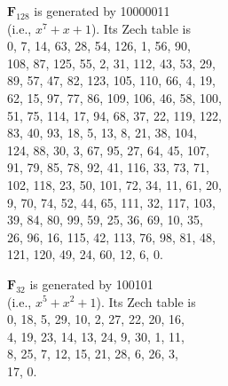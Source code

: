 \documentclass[a4paper]{article}
\def\FF{\mathbf F}
\begin{document}
$\FF_{128}$ is generated by 10000011 \\
(i.e., $x^7 + x + 1$).
Its Zech table is \\
0, 7, 14, 63, 28, 54, 126, 1, 56, 90, \\
108, 87, 125, 55, 2, 31, 112, 43, 53, 29, \\
89, 57, 47, 82, 123, 105, 110, 66, 4, 19, \\
62, 15, 97, 77, 86, 109, 106, 46, 58, 100, \\
51, 75, 114, 17, 94, 68, 37, 22, 119, 122, \\
83, 40, 93, 18, 5, 13, 8, 21, 38, 104, \\
124, 88, 30, 3, 67, 95, 27, 64, 45, 107, \\
91, 79, 85, 78, 92, 41, 116, 33, 73, 71, \\
102, 118, 23, 50, 101, 72, 34, 11, 61, 20, \\
9, 70, 74, 52, 44, 65, 111, 32, 117, 103, \\
39, 84, 80, 99, 59, 25, 36, 69, 10, 35, \\
26, 96, 16, 115, 42, 113, 76, 98, 81, 48, \\
121, 120, 49, 24, 60, 12, 6, 0.

\vskip-15cm

$\FF_{32}$ is generated by 100101 \\
(i.e., $x^5 + x^2 + 1$).
Its Zech table is \\
0, 18, 5, 29, 10, 2, 27, 22, 20, 16, \\
4, 19, 23, 14, 13, 24, 9, 30, 1, 11, \\
8, 25, 7, 12, 15, 21, 28, 6, 26, 3, \\
17, 0.
\end{document}
